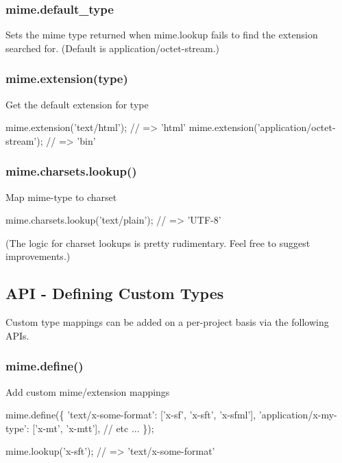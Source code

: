 \subsubsection*{mime.\+default\+\_\+type}

Sets the mime type returned when {\ttfamily mime.\+lookup} fails to find the extension searched for. (Default is {\ttfamily application/octet-\/stream}.)

\subsubsection*{mime.\+extension(type)}

Get the default extension for {\ttfamily type}


\begin{DoxyCode}
mime.extension('text/html');                 // => 'html'
mime.extension('application/octet-stream');  // => 'bin'
\end{DoxyCode}


\subsubsection*{mime.\+charsets.\+lookup()}

Map mime-\/type to charset


\begin{DoxyCode}
mime.charsets.lookup('text/plain');        // => 'UTF-8'
\end{DoxyCode}


(The logic for charset lookups is pretty rudimentary. Feel free to suggest improvements.)

\subsection*{A\+PI -\/ Defining Custom Types}

Custom type mappings can be added on a per-\/project basis via the following A\+P\+Is.

\subsubsection*{mime.\+define()}

Add custom mime/extension mappings


\begin{DoxyCode}
mime.define(\{
    'text/x-some-format': ['x-sf', 'x-sft', 'x-sfml'],
    'application/x-my-type': ['x-mt', 'x-mtt'],
    // etc ...
\});

mime.lookup('x-sft');                 // => 'text/x-some-format'
\end{DoxyCode}


